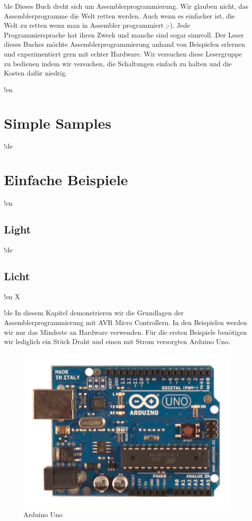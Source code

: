 \documentclass[twoside,12pt,authoryear,openright]{book}
\begin{document}
!de Dieses Buch dreht sich um Assemblerprogrammierung. Wir glauben nicht, das Assemblerprogramme die Welt retten werden. Auch wenn es einfacher ist, die Welt zu retten wenn man in Assembler programmiert ;-). Jede Programmiersprache hat ihren Zweck und manche sind sogar sinnvoll. Der Leser dieses Buches möchte Assemblerprogrammierung anhand von Beispielen erlernen und experimentiert gern mit echter Hardware. Wir versuchen diese Lesergruppe zu bedienen indem wir versuchen, die Schaltungen einfach zu halten und die Kosten dafür niedrig.

\tableofcontents{}
\listoffigures{}
\listoftables{}


!en \part{Simple Samples}
!de \part{Einfache Beispiele}


!en \chapter{Light}
!de \chapter{Licht}



!en X

!de In diesem Kapitel demonstrieren wir die Grundlagen der Assemblerprogrammierung mit AVR Micro Controllern. In den Beispielen werden wir nur das Mindeste an Hardware verwenden. Für die ersten Beispiele benötigen wir lediglich ein Stück Draht und einen mit Strom versorgten Arduino Uno.


\begin{figure}[htbp]
  \centering
  \includegraphics[width=120mm]{Media/www-arduino-cc_ArduinoUnoFront.jpeg}
  \caption{Arduino Uno}
  \label{ArduinoUnoFront}
\end{figure}
\end{document}
